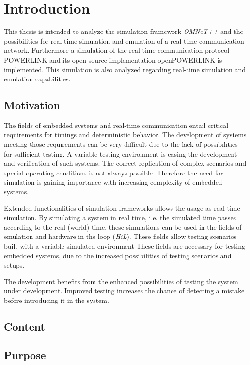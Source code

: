 \chapter{Introduction}
\label{cha:introduction}
This thesis is intended to analyze the simulation framework \emph{OMNeT++} \cite{omnet_manual} and the possibilities for real-time simulation and emulation of a real time communication network.
Furthermore a simulation of the real-time communication protocol POWERLINK and its open source implementation \mbox{openPOWERLINK} \cite{openpowerlink} is implemented. %
This simulation is also analyzed regarding real-time simulation and emulation capabilities.

\section{Motivation}
The fields of embedded systems and real-time communication entail critical requirements for timings and deterministic behavior.
The development of systems meeting those requirements can be very difficult due to the lack of possibilities for sufficient testing.
A variable testing environment is easing the development and verification of such systems.
The correct replication of complex scenarios and special operating conditions is not always possible.
Therefore the need for simulation is gaining importance with increasing complexity of embedded systems.

Extended functionalities of simulation frameworks allows the usage as real-time simulation.
By simulating a system in real time, i.e. the simulated time passes according to the real (world) time, these simulations can be used in the fields of emulation and hardware in the loop (\emph{HiL}).
These fields allow testing scenarios built with a variable simulated environment
These fields are necessary for testing embedded systems, due to the increased possibilities of testing scenarios and setups.

The development benefits from the enhanced possibilities of testing the system under development.
Improved testing increases the chance of detecting a mistake before introducing it in the system.



\section{Content}

\section{Purpose}
